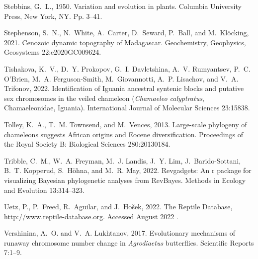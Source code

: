 \documentclass[a4paper, 12pt]{article}
\begin{document}
\begin{thebibliography}{73}
{
Stebbins, G.~L., 1950.
\newblock Variation and evolution in plants.
\newblock Columbia University Press, New York, NY. Pp. 3--41.

Stephenson, S.~N., N.~White, A.~Carter, D.~Seward, P.~Ball, and
  M.~Kl{\"o}cking, 2021.
\newblock Cenozoic dynamic topography of {M}adagascar.
\newblock Geochemistry, Geophysics, Geosystems 22:e2020GC009624.

Tishakova, K.~V., D.~Y. Prokopov, G.~I. Davletshina, A.~V. Rumyantsev, P.~C.
  O'Brien, M.~A. Ferguson-Smith, M.~Giovannotti, A.~P. Lisachov, and V.~A.
  Trifonov, 2022.
\newblock Identification of {I}guania ancestral syntenic blocks and putative
  sex chromosomes in the veiled chameleon (\textit{{C}hamaeleo calyptratus},
  {C}hamaeleonidae, {I}guania).
\newblock International Journal of Molecular Sciences 23:15838.

Tolley, K.~A., T.~M. Townsend, and M.~Vences, 2013.
\newblock Large-scale phylogeny of chameleons suggests {A}frican origins and
  {E}ocene diversification.
\newblock Proceedings of the Royal Society B: Biological Sciences 280:20130184.

Tribble, C.~M., W.~A. Freyman, M.~J. Landis, J.~Y. Lim, J.~Barido-Sottani,
  B.~T. Kopperud, S.~H{\"o}hna, and M.~R. May, 2022.
\newblock Revgadgets: An r package for visualizing {B}ayesian phylogenetic
  analyses from {R}ev{B}ayes.
\newblock Methods in Ecology and Evolution 13:314--323.

Uetz, P., P.~Freed, R.~Aguilar, and J.~Ho{\v s}ek, 2022.
\newblock The {R}eptile {D}atabase, http://www.reptile-database.org. {A}ccessed
  {A}ugust 2022 .

Vershinina, A.~O. and V.~A. Lukhtanov, 2017.
\newblock Evolutionary mechanisms of runaway chromosome number change in
  \textit{Agrodiaetus} butterflies.
\newblock Scientific Reports 7:1--9.

}
\end{thebibliography}
\end{document}
